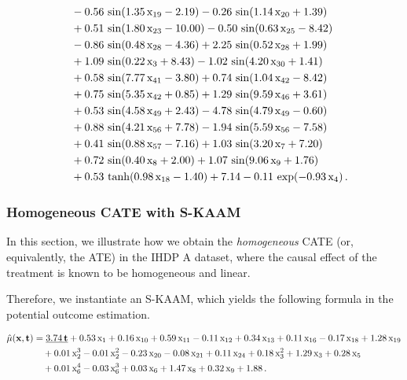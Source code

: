 {\begin{align*}
&\quad - 0.56\,\sin(1.35\,\text{x}_{19} - 2.19)
- 0.26\,\sin(1.14\,\text{x}_{20} + 1.39) \\
&\quad + 0.51\,\sin(1.80\,\text{x}_{23} - 10.00)
- 0.50\,\sin(0.63\,\text{x}_{25} - 8.42) \\
&\quad - 0.86\,\sin(0.48\,\text{x}_{28} - 4.36)
+ 2.25\,\sin(0.52\,\text{x}_{28} + 1.99) \\
&\quad + 1.09\,\sin(0.22\,\text{x}_{3} + 8.43)
- 1.02\,\sin(4.20\,\text{x}_{30} + 1.41) \\
&\quad + 0.58\,\sin(7.77\,\text{x}_{41} - 3.80)
+ 0.74\,\sin(1.04\,\text{x}_{42} - 8.42) \\
&\quad + 0.75\,\sin(5.35\,\text{x}_{42} + 0.85)
+ 1.29\,\sin(9.59\,\text{x}_{46} + 3.61) \\
&\quad + 0.53\,\sin(4.58\,\text{x}_{49} + 2.43)
- 4.78\,\sin(4.79\,\text{x}_{49} - 0.60) \\
&\quad + 0.88\,\sin(4.21\,\text{x}_{56} + 7.78)
- 1.94\,\sin(5.59\,\text{x}_{56} - 7.58) \\
&\quad + 0.41\,\sin(0.88\,\text{x}_{57} - 7.16)
+ 1.03\,\sin(3.20\,\text{x}_{7} + 7.20) \\
&\quad + 0.72\,\sin(0.40\,\text{x}_{8} + 2.00)
+ 1.07\,\sin(9.06\,\text{x}_{9} + 1.76) \\
&\quad + 0.53\,\tanh(0.98\,\text{x}_{18} - 1.40)
+ 7.14
- 0.11\,\exp(-0.93\,\text{x}_{4}) \, .
\end{align*}

\subsubsection{Homogeneous CATE with S-KAAM}
\label{app:sec:results_visualizations_skaam}

In this section, we illustrate how we obtain the \emph{homogeneous} CATE (or, equivalently, the ATE) in the IHDP A dataset, where the causal effect of the treatment is known to be homogeneous and linear.

Therefore, we instantiate an S-KAAM, which yields the following formula in the potential outcome estimation.

\begin{align*}
\hat{\mu}({\mathbf{x}},{\mathbf{t}})
&= \underline{3.74\,{\mathbf{t}}}
+ 0.53\,\text{x}_{1}
+ 0.16\,\text{x}_{10}
+ 0.59\,\text{x}_{11}
- 0.11\,\text{x}_{12}
+ 0.34\,\text{x}_{13}
+ 0.11\,\text{x}_{16}
- 0.17\,\text{x}_{18}
+ 1.28\,\text{x}_{19} \\
&\quad
+ 0.01\,\text{x}_{2}^{3}
- 0.01\,\text{x}_{2}^{2}
- 0.23\,\text{x}_{20}
- 0.08\,\text{x}_{21}
+ 0.11\,\text{x}_{24}
+ 0.18\,\text{x}_{3}^{2}
+ 1.29\,\text{x}_{3}
+ 0.28\,\text{x}_{5} \\
&\quad
+ 0.01\,\text{x}_{6}^{4}
- 0.03\,\text{x}_{6}^{3}
+ 0.03\,\text{x}_{6}
+ 1.47\,\text{x}_{8}
+ 0.32\,\text{x}_{9}
+ 1.88 \, .
\end{align*}}

